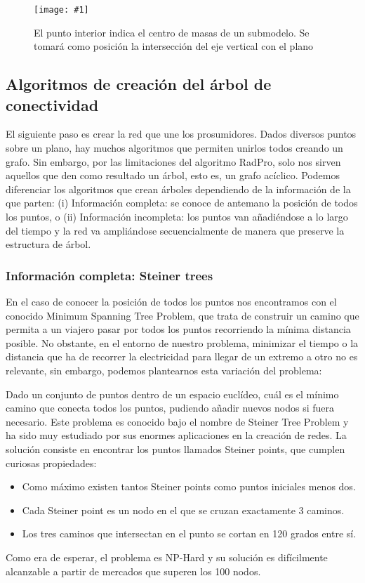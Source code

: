 \documentclass[12pt,a4paper,openright,oneside]{article}
\newcommand{\includeImage}[3]
{
	\begin{figure}[H]
	\begin{center}
	\texttt{[image: \#1]}
	\end{center}
	\caption{#3}
	\end{figure}
}
\numberwithin{equation}{section}
\theoremstyle{definition}
\begin{document}
\includeImage{gravity_center.png}{5}{El punto interior indica el centro de masas de un submodelo. Se tomará como posición la intersección del eje vertical con el plano}

\subsection{Algoritmos de creación del árbol de conectividad}

El siguiente paso es crear la red que une los prosumidores. Dados diversos puntos sobre un plano, hay muchos algoritmos que permiten unirlos todos creando un grafo. Sin embargo, por las limitaciones del algoritmo RadPro, solo nos sirven aquellos que den como resultado un árbol, esto es, un grafo acíclico.
Podemos diferenciar los algoritmos que crean árboles dependiendo de la información de la que parten: (i) Información completa: se conoce de antemano la posición de todos los puntos, o (ii) Información incompleta: los puntos van añadiéndose a lo largo del tiempo y la red va ampliándose secuencialmente de manera que preserve la estructura de árbol.

\subsubsection{Información completa: Steiner trees }

En el caso de conocer la posición de todos los puntos nos encontramos con el conocido Minimum Spanning Tree Problem, que trata de construir un camino que permita a un viajero pasar por todos los puntos recorriendo la mínima distancia posible. No obstante, en el entorno de nuestro problema, minimizar  el tiempo o la distancia que ha de recorrer la electricidad para llegar de un extremo a otro no es relevante, sin embargo, podemos plantearnos esta variación del problema:

Dado un conjunto de puntos dentro de un espacio euclídeo, cuál es el mínimo camino que conecta todos los puntos, pudiendo añadir nuevos nodos si fuera necesario. Este problema es conocido bajo el nombre de Steiner Tree Problem y ha sido muy estudiado por sus enormes aplicaciones en la creación de redes. La solución consiste en encontrar los puntos llamados Steiner points, que cumplen curiosas propiedades:
\begin{itemize} 
\item Como máximo existen tantos Steiner points como puntos iniciales menos dos.
\item Cada Steiner point es un nodo en el que se cruzan exactamente 3 caminos.
\item Los tres caminos que intersectan en el punto se cortan en 120 grados entre sí.
\end{itemize}
Como era de esperar, el problema es NP-Hard y su solución es difícilmente alcanzable a partir de mercados que superen los 100 nodos.
\end{document}

